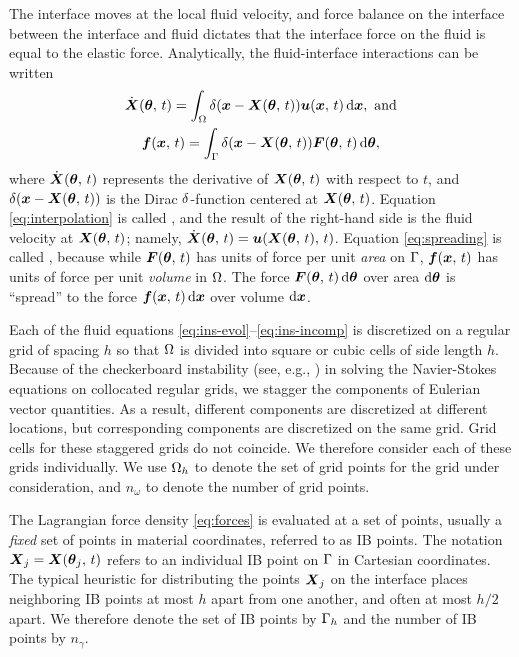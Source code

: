 The interface moves at the local fluid velocity, and force balance on the interface
between the interface and fluid dictates that the interface force on the fluid is equal
to the elastic force. Analytically, the fluid-interface interactions can be written
\begin{gather}
    \label{eq:interpolation}
    \U(\params,\,t) = \int_\domain \Dirac(\x-\X(\params,\,t)) \u(\x,\,t)\d\x,\ \text{and} \\
    \label{eq:spreading}
    \f(\x,\,t) = \int_\interface \Dirac(\x-\X(\params,\,t))\F(\params,\,t)\d\params,
\end{gather}
where $\dot{\boldsymbol{X}}(\boldsymbol{\theta},\,t)$ represents the derivative of $\boldsymbol{X}(\boldsymbol{\theta},\,t)$ with respect to
$t$, and $\delta(\boldsymbol{x}-\boldsymbol{X}(\boldsymbol{\theta},\,t))$ is the Dirac $\delta$-function centered at
$\boldsymbol{X}(\boldsymbol{\theta},\,t)$.  Equation \eqref{eq:interpolation} is called , and
the result of the right-hand side is the fluid velocity at $\boldsymbol{X}(\boldsymbol{\theta},\,t)$; namely,
$\dot{\boldsymbol{X}}(\boldsymbol{\theta},\,t) = \boldsymbol{u}(\boldsymbol{X}(\boldsymbol{\theta},\,t),\,t)$.  Equation \eqref{eq:spreading} is called
, because while $\boldsymbol{F}(\boldsymbol{\theta},\,t)$ has units of force per unit \emph{area}
on $\Gamma$, $\boldsymbol{f}(\boldsymbol{x},\,t)$ has units of force per unit \emph{volume} in $\Omega$. The
force $\F(\params,\,t)\d\params$ over area $\d\params$ is ``spread'' to the force
$\f(\x,\,t)\d\x$ over volume $\d\x$. 

Each of the fluid equations \eqref{eq:ins-evol}--\eqref{eq:ins-incomp}
is discretized on a regular grid of spacing $h$ so that $\Omega$ is divided into square
or cubic cells of side length $h$. Because of the checkerboard instability (see, e.g.,
\cite{Wesseling:2001ci}) in solving the Navier-Stokes equations on collocated regular
grids, we stagger the components of Eulerian vector quantities. As a result, different
components are discretized at different locations, but corresponding components are
discretized on the same grid. Grid cells for these staggered grids do not coincide. We
therefore consider each of these grids individually. We use $\Omega_h$ to denote the set
of grid points for the grid under consideration, and $n_\omega$ to denote the number of
grid points.

The Lagrangian force density \ref{eq:forces} is evaluated at a set of points, usually a
\emph{fixed} set of points in material coordinates, referred to as IB points. The
notation $\boldsymbol{X}_j=\boldsymbol{X}(\boldsymbol{\theta}_j,\,t)$ refers to an individual IB point on $\Gamma$ in
Cartesian coordinates. The typical heuristic for distributing the points $\boldsymbol{X}_j$ on the
interface places neighboring IB points at most $h$ apart from one another, and often at
most $h/2$ apart. We therefore denote the set of IB points by $\Gamma_h$ and the
number of IB points by $n_\gamma$.

